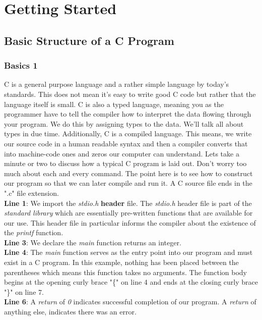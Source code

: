 \documentclass[../main.tex]{subfiles}
\begin{document}

\chapter{Getting Started}


\section{Basic Structure of a C Program}
\subsection{Basics 1}
C is a general purpose language and a rather simple language by today's standards.  This does not mean it's easy to write good C code but rather that the language itself is small. C is also a typed language, meaning you as the programmer have to tell the compiler how to interpret the data flowing through your program.  We do this by assigning types to the data.  We'll talk all about types in due time.  Additionally, C is a compiled language.  This means, we write our source code in a human readable syntax and then a compiler converts that into machine-code ones and zeros our computer can understand.  Lets take a minute or two to discuss how a typical C program is laid out.  Don't worry too much about each and every command.  The point here is to see how to construct our program so that we can later compile and run it. A C source file ends in the ".c" file extension.
\\


\textbf{Line 1}: We import the \textit{stdio.h} \textbf{header} file. The \textit{stdio.h} header file is part of the \textit{standard library} which are essentially pre-written functions that are available for our use. This header file in particular informs the compiler about the existence of the \textit{printf} function.\\
\textbf{Line 3}: We declare the \textit{main} function returns an integer.\\
\textbf{Line 4}: The \textit{main} function serves as the entry point into our program and must exist in a C program.  In this example, nothing has been placed between the parentheses which means this function takes no arguments. The function body begins at the opening curly brace "\{" on line 4 and ends at the closing curly brace "\}" on line 7.\\
\textbf{Line 6}: A \textit{return} of \textit{0} indicates successful completion of our program.  A \textit{return} of anything else, indicates there was an error.\\
\end{document}
